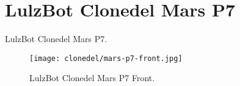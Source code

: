 %
%
%
%
%

\section{LulzBot Clonedel Mars P7}
LulzBot Clonedel Mars P7.

\begin{figure}[h!]
\texttt{[image: clonedel/mars-p7-front.jpg]}
 \caption{LulzBot Clonedel Mars P7 Front.}
 \label{fig:clonedel-mars-p7-front}
\end{figure}


